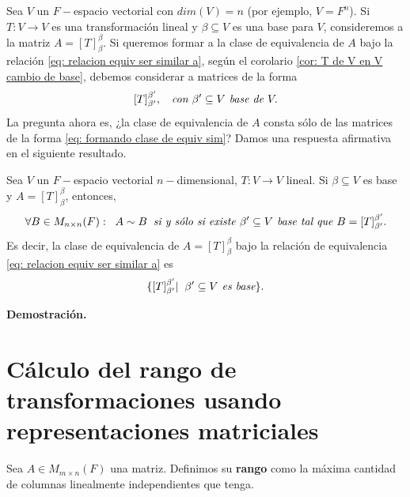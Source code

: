 Sea $V$ un $F-$espacio vectorial
con $dim(V) = n$ (por ejemplo, $V = F^{n}$).
Si $T: V \longrightarrow V$ es una transformación lineal y 
$\beta \subseteq V$ es una base para $V$, consideremos a la
matriz $A = [T]_{\beta}^{\beta}$. Si queremos formar a la clase
de equivalencia de $A$ bajo la relación 
\eqref{eq: relacion equiv ser similar a}, según el corolario
\ref{cor: T de V en V cambio de base}, debemos considerar 
a matrices de la forma 
\begin{equation}
	\label{eq: formando clase de equiv sim}
	[T]_{\beta'}^{\beta'}, \hspace{0.2cm} \textit{ con }
\beta' \subseteq V \textit{ base de } V.
\end{equation}
La pregunta ahora es, ¿la clase de equivalencia de $A$ consta
sólo de las matrices de la forma \eqref{eq: formando clase de equiv sim}?
Damos una respuesta afirmativa en el siguiente resultado.

\begin{teo}
	\label{teo: similar a repr matricial de T sii tambien es repr matr de T}
	Sea $V$ un $F-$espacio vectorial $n-$dimensional, $T: V \longrightarrow V$
	lineal. Si $\beta \subseteq V$ es base y $A = [T]_{\beta}^{\beta}$, 
	entonces,
	\[
	\forall B \in M_{n \times n}(F): \hspace{0.2cm} A \sim B \hspace{0.2cm}
	\textit{si y sólo si existe } \beta' \subseteq V \textit{ base 
	tal que } B = [T]_{\beta'}^{\beta'}.
	\]
	Es decir, la clase de equivalencia de $A = [T]_{\beta}^{\beta}$
	bajo la relación de equivalencia 
	\eqref{eq: relacion equiv ser similar a} es
	\[
	\{ [T]_{\beta'}^{\beta'}  | \hspace{0.2cm} \beta' \subseteq V \textit{ 
	es base} \}.
	\]
\end{teo}
\noindent
\textbf{Demostración.}

\QEDB
\vspace{0.2cm}


\section{Cálculo del rango de transformaciones usando representaciones matriciales}

\begin{defi}
Sea $A \in M_{m \times n}(F)$ una matriz. Definimos su \textbf{rango}
como la máxima cantidad de columnas linealmente independientes que tenga.
\end{defi}

